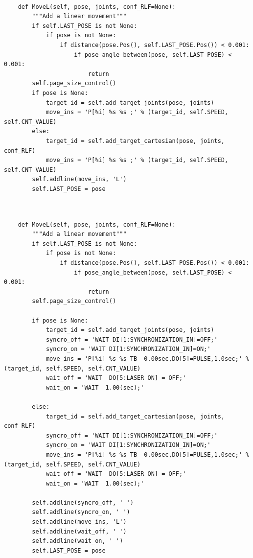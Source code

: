 \begin{code}
\begin{verbatim}

    def MoveL(self, pose, joints, conf_RLF=None):
        """Add a linear movement"""
        if self.LAST_POSE is not None:
            if pose is not None:
                if distance(pose.Pos(), self.LAST_POSE.Pos()) < 0.001:
                    if pose_angle_between(pose, self.LAST_POSE) < 0.001:
                        return
        self.page_size_control()
        if pose is None:
            target_id = self.add_target_joints(pose, joints)
            move_ins = 'P[%i] %s %s ;' % (target_id, self.SPEED, self.CNT_VALUE)
        else:
            target_id = self.add_target_cartesian(pose, joints, conf_RLF)
            move_ins = 'P[%i] %s %s ;' % (target_id, self.SPEED, self.CNT_VALUE)
        self.addline(move_ins, 'L')
        self.LAST_POSE = pose


\end{verbatim}
\label{code:originalMoveL}
\end{code}

\begin{code}
\begin{verbatim}

    def MoveL(self, pose, joints, conf_RLF=None):
        """Add a linear movement"""
        if self.LAST_POSE is not None:
            if pose is not None:
                if distance(pose.Pos(), self.LAST_POSE.Pos()) < 0.001:
                    if pose_angle_between(pose, self.LAST_POSE) < 0.001:
                        return
        self.page_size_control()
        
        if pose is None:
            target_id = self.add_target_joints(pose, joints)
            syncro_off = 'WAIT DI[1:SYNCHRONIZATION_IN]=OFF;'
            syncro_on = 'WAIT DI[1:SYNCHRONIZATION_IN]=ON;'
            move_ins = 'P[%i] %s %s TB  0.00sec,DO[5]=PULSE,1.0sec;' % (target_id, self.SPEED, self.CNT_VALUE)
            wait_off = 'WAIT  DO[5:LASER ON] = OFF;'
            wait_on = 'WAIT  1.00(sec);'
            
        else:
            target_id = self.add_target_cartesian(pose, joints, conf_RLF)
            syncro_off = 'WAIT DI[1:SYNCHRONIZATION_IN]=OFF;'
            syncro_on = 'WAIT DI[1:SYNCHRONIZATION_IN]=ON;'
            move_ins = 'P[%i] %s %s TB  0.00sec,DO[5]=PULSE,1.0sec;' % (target_id, self.SPEED, self.CNT_VALUE)
            wait_off = 'WAIT  DO[5:LASER ON] = OFF;'
            wait_on = 'WAIT  1.00(sec);'
            
        self.addline(syncro_off, ' ')
        self.addline(syncro_on, ' ')
        self.addline(move_ins, 'L')
        self.addline(wait_off, ' ')
        self.addline(wait_on, ' ')
        self.LAST_POSE = pose


\end{verbatim}
\label{code:modifiedMoveL}
\end{code}

